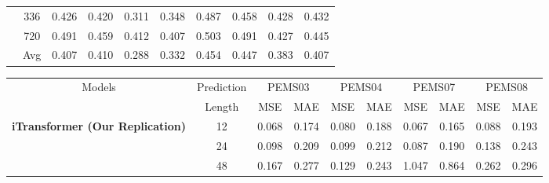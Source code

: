 \documentclass[twoside,12pt]{article}
\begin{document}
\begin{table}[htbp]
{\begin{small}
\begin{tabular}{c|c|cc|cc|cc|cc}
                                                                 & 336        & 0.426                      & 0.420                      & 0.311                      & 0.348                      & 0.487 & 0.458 & 0.428 & 0.432 \\
                                                                 & 720        & 0.491                      & 0.459                      & 0.412                      & 0.407                      & 0.503 & 0.491 & 0.427 & 0.445 \\
        \cmidrule(lr){2-10}
                                                                 & Avg        & 0.407                      & 0.410                      & 0.288                      & 0.332                      & 0.454 & 0.447 & 0.383 & 0.407 \\
        \bottomrule
      \end{tabular}
    \end{small}
  }
  \resizebox{0.9\textwidth}{!}
  {
    \begin{small}
      \renewcommand{\multirowsetup}{\centering}
      \setlength{\tabcolsep}{5.3pt}
      \begin{tabular}{c|c|cc|cc|cc|cc}
        \toprule
        \multirow{2}{*}{Models}                                  & Prediction & \multicolumn{2}{c|}{PEMS03} & \multicolumn{2}{c|}{PEMS04} & \multicolumn{2}{c|}{PEMS07} & \multicolumn{2}{c|}{PEMS08}                                 \\
        \cmidrule(lr){3-4} \cmidrule(lr){5-6} \cmidrule(lr){7-8} \cmidrule(lr){9-10}
                                                                 & Length     & MSE                         & MAE                         & MSE                         & MAE                         & MSE   & MAE   & MSE   & MAE   \\
        \midrule
        \multirow{5}{*}{\textbf{iTransformer (Our Replication)}} & 12         & 0.068                       & 0.174                       & 0.080                       & 0.188                       & 0.067 & 0.165 & 0.088 & 0.193 \\
                                                                 & 24         & 0.098                       & 0.209                       & 0.099                       & 0.212                       & 0.087 & 0.190 & 0.138 & 0.243 \\
                                                                 & 48         & 0.167                       & 0.277                       & 0.129                       & 0.243                       & 1.047 & 0.864 & 0.262 & 0.296 \\

\end{tabular}
\end{small}}
\end{table}
\end{document}
